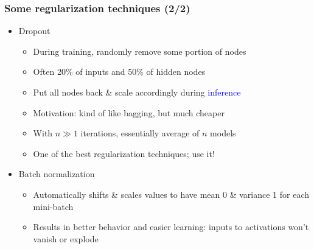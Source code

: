 \begin{frame}
    \frametitle{Some regularization techniques (2/2)}
    \begin{itemize}
        \item<+-> \alert{Dropout} \citep{SrivastavaJMLR14}
        \begin{itemize}[<.->]
            \item During \textcolor{Green4}{training}, randomly remove some portion of nodes
            \item Often 20\% of inputs and 50\% of hidden nodes
            \item<+-> Put all nodes back \& scale accordingly during \textcolor{blue}{inference}
            \item<+-> Motivation: kind of like bagging, but much cheaper
            \item With $n \gg 1$ iterations, essentially average of $n$ models
            \item One of the best regularization techniques; use it!
        \end{itemize}
    \end{itemize}

    
    \hfill
    
    \hfill
    
    \hfill

    \begin{itemize}
        \item \alert{Batch normalization} \citep{IoffeICML15}
        \begin{itemize}
            \item Automatically shifts \& scales values to have mean 0 \& variance 1 for each mini-batch
            \item Results in better behavior and easier learning: inputs to activations won't vanish or explode
        \end{itemize}
    \end{itemize}
\end{frame}

